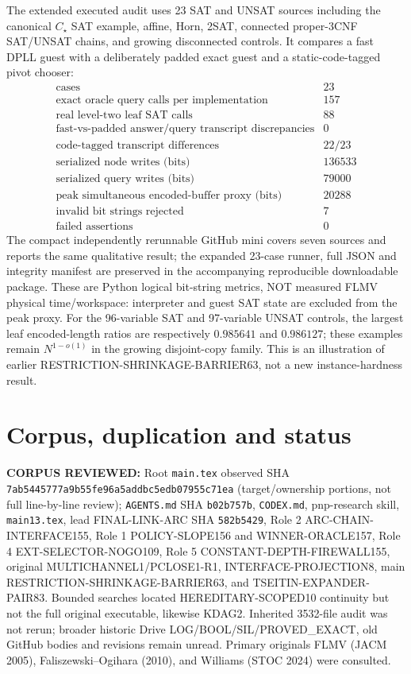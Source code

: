 \documentclass[11pt]{article}
\begin{document}
The extended executed audit uses 23 SAT and UNSAT sources including the canonical $C_\star$ SAT example, affine, Horn, 2SAT, connected proper-3CNF SAT/UNSAT chains, and growing disconnected controls. It compares a fast DPLL guest with a deliberately padded exact guest and a static-code-tagged pivot chooser:
\[
\begin{array}{lr}
\text{cases}&23\\
\text{exact oracle query calls per implementation}&157\\
\text{real level-two leaf SAT calls}&88\\
\text{fast-vs-padded answer/query transcript discrepancies}&0\\
\text{code-tagged transcript differences}&22/23\\
\text{serialized node writes (bits)}&136533\\
\text{serialized query writes (bits)}&79000\\
\text{peak simultaneous encoded-buffer proxy (bits)}&20288\\
\text{invalid bit strings rejected}&7\\
\text{failed assertions}&0
\end{array}
\]
The compact independently rerunnable GitHub mini covers seven sources and reports the same qualitative result; the expanded 23-case runner, full JSON and integrity manifest are preserved in the accompanying reproducible downloadable package. These are Python logical bit-string metrics, NOT measured FLMV physical time/workspace: interpreter and guest SAT state are excluded from the peak proxy. For the 96-variable SAT and 97-variable UNSAT controls, the largest leaf encoded-length ratios are respectively $0.985641$ and $0.986127$; these examples remain $N^{1-o(1)}$ in the growing disjoint-copy family. This is an illustration of earlier RESTRICTION-SHRINKAGE-BARRIER63, not a new instance-hardness result.

\section{Corpus, duplication and status}
\textbf{CORPUS REVIEWED:} Root \texttt{main.tex} observed SHA \texttt{7ab5445777a9b55fe96a5addbc5edb07955c71ea} (target/ownership portions, not full line-by-line review); \texttt{AGENTS.md} SHA \texttt{b02b757b}, \texttt{CODEX.md}, pnp-research skill, \texttt{main13.tex}, lead FINAL-LINK-ARC SHA \texttt{582b5429}, Role 2 ARC-CHAIN-INTERFACE155, Role 1 POLICY-SLOPE156 and WINNER-ORACLE157, Role 4 EXT-SELECTOR-NOGO109, Role 5 CONSTANT-DEPTH-FIREWALL155, original MULTICHANNEL1/PCLOSE1-R1, INTERFACE-PROJECTION8, main RESTRICTION-SHRINKAGE-BARRIER63, and TSEITIN-EXPANDER-PAIR83. Bounded searches located HEREDITARY-SCOPED10 continuity but not the full original executable, likewise KDAG2. Inherited 3532-file audit was not rerun; broader historic Drive LOG/BOOL/SIL/PROVED\_EXACT, old GitHub bodies and revisions remain unread. Primary originals FLMV (JACM 2005), Faliszewski--Ogihara (2010), and Williams (STOC 2024) were consulted.
\end{document}
